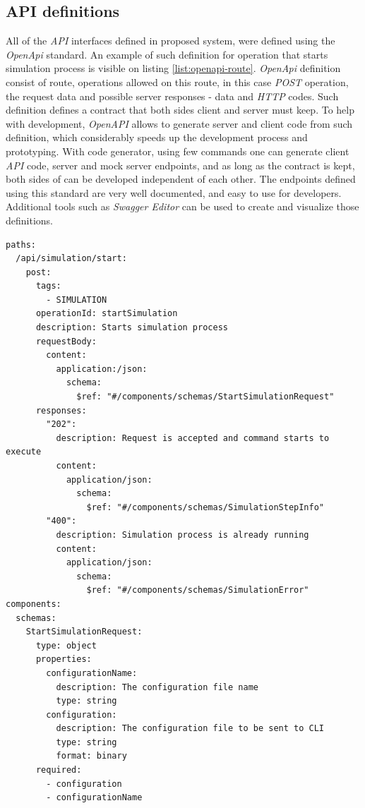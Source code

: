 \subsection{API definitions}
All of the \textit{API} interfaces defined in proposed system, were defined using the \textit{OpenApi} standard. An example of such definition for operation that starts simulation process is visible on listing \ref{list:openapi-route}. \textit{OpenApi} definition consist of route, operations allowed on this route, in this case \textit{POST} operation, the request data and possible server responses - data and \textit{HTTP} codes. Such definition defines a contract that both sides client and server must keep. To help with development, \textit{OpenAPI} allows to generate server and client code from such definition, which considerably speeds up the development process and prototyping. With code generator, using few commands one can generate client \textit{API} code, server and mock server endpoints, and as long as the contract is kept, both sides of can be developed independent of each other. The endpoints defined using this standard are very well documented, and easy to use for developers. Additional tools such as \textit{Swagger Editor} can be used to create and visualize those definitions. 
\begin{lstlisting}[label=list:openapi-route,caption=The \textit{OpenAPI} route definition for simulation start request, basicstyle=\footnotesize\ttfamily]
paths:
  /api/simulation/start:
    post:
      tags:
        - SIMULATION
      operationId: startSimulation
      description: Starts simulation process
      requestBody:
        content:
          application:/json:
            schema:
              $ref: "#/components/schemas/StartSimulationRequest"
      responses:
        "202":
          description: Request is accepted and command starts to execute
          content:
            application/json:
              schema:
                $ref: "#/components/schemas/SimulationStepInfo"
        "400":
          description: Simulation process is already running
          content:
            application/json:
              schema:
                $ref: "#/components/schemas/SimulationError"
components:
  schemas:
    StartSimulationRequest:
      type: object
      properties:
        configurationName:
          description: The configuration file name
          type: string
        configuration:
          description: The configuration file to be sent to CLI
          type: string
          format: binary
      required:
        - configuration
        - configurationName
\end{lstlisting}
